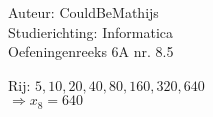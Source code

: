 \documentclass[a4paper]{article}
\begin{document}
  
\noindent \large Auteur: CouldBeMathijs \\
\noindent \large Studierichting: Informatica\\
\noindent \large Oefeningenreeks 6A nr. 8.5\\

\medskip

\normalsize

Rij: $5, 10, 20, 40, 80, 160, 320, 640$\\

$\Rightarrow x_8 = 640$
\begin{thebibliography}{999}
\end{thebibliography}
\end{document}
